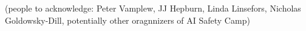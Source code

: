 (people to acknowledge: Peter Vamplew, JJ Hepburn, Linda Linsefors, Nicholas Goldowsky-Dill, potentially other oragnnizers of AI Safety Camp)